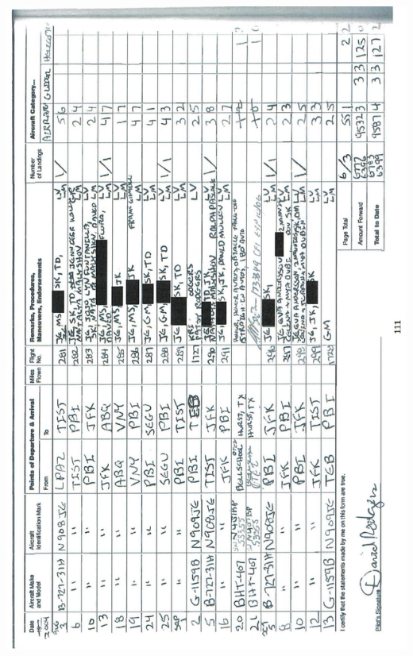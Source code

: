 \documentclass[10pt]{article}
\begin{document}
\includegraphics[max width=\textwidth, center]{2025_02_27_dd68c3d38de88f0516d9g-115}\\
\end{document}
